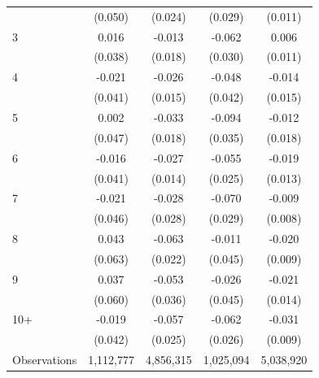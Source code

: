 \begin{table}[htbp]
\begin{tabular}{l*{4}{c}}
            &     (0.050)         &     (0.024)         &     (0.029)         &     (0.011)         \\
[1em]
3           &       0.016         &      -0.013         &      -0.062\sym{**} &       0.006         \\
            &     (0.038)         &     (0.018)         &     (0.030)         &     (0.011)         \\
[1em]
4           &      -0.021         &      -0.026\sym{*}  &      -0.048         &      -0.014         \\
            &     (0.041)         &     (0.015)         &     (0.042)         &     (0.015)         \\
[1em]
5           &       0.002         &      -0.033\sym{*}  &      -0.094\sym{***}&      -0.012         \\
            &     (0.047)         &     (0.018)         &     (0.035)         &     (0.018)         \\
[1em]
6           &      -0.016         &      -0.027\sym{*}  &      -0.055\sym{**} &      -0.019         \\
            &     (0.041)         &     (0.014)         &     (0.025)         &     (0.013)         \\
[1em]
7           &      -0.021         &      -0.028         &      -0.070\sym{**} &      -0.009         \\
            &     (0.046)         &     (0.028)         &     (0.029)         &     (0.008)         \\
[1em]
8           &       0.043         &      -0.063\sym{***}&      -0.011         &      -0.020\sym{**} \\
            &     (0.063)         &     (0.022)         &     (0.045)         &     (0.009)         \\
[1em]
9           &       0.037         &      -0.053         &      -0.026         &      -0.021         \\
            &     (0.060)         &     (0.036)         &     (0.045)         &     (0.014)         \\
[1em]
10+         &      -0.019         &      -0.057\sym{**} &      -0.062\sym{**} &      -0.031\sym{***}\\
            &     (0.042)         &     (0.025)         &     (0.026)         &     (0.009)         \\
\hline
Observations&   1,112,777         &   4,856,315         &   1,025,094         &   5,038,920         \\

\end{tabular}
\end{table}
